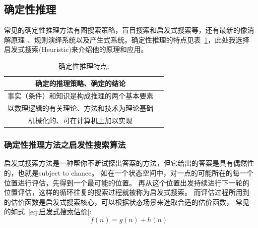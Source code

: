 \documentclass[12pt,a4paper,UTF8]{ctexart}
\begin{document}
\subsection{确定性推理}
常见的确定性推理方法有图搜索策略，盲目搜索和启发式搜索等，还有最新的像消解原理
、规则演绎系统以及产生式系统。确定性推理的特点见表~\ref{table:qdx特点}，此处我选择启发式搜索(Heuristic)来介绍他的原理和应用。
\begin{table}[htb]
    \centering
    \caption{确定性推理特点.}
    \label{table:qdx特点}
    \begin{tabular}{@{}cc@{}}
    \toprule
    确定的推理策略、确定的结论                             \\ \hline
    \multicolumn{1}{l}{事实（条件）和知识是构成推理的两个基本要素} \\ \hline
    以数理逻辑的有关理论、方法和技术为理论基础                     \\ \hline
    机械化的、可在计算机上加以实现                           \\ \hline
    \toprule
    \end{tabular}
\end{table}
\subsubsection{确定性推理方法之启发性搜索算法}
启发式搜索方法是一种帮你不断试探出答案的方法，但它给出的答案是具有偶然性的，也就是subject to chance。
如在一个状态空间中，对一点的可能所在的每一个位置进行评估，先得到一个最可能的位置。
再从这个位置出发持续进行下一轮的位置评估，这样的循环往复的搜索过程就被称为启发式搜索。
而评估过程所用到的估价函数是启发式搜索核心，可以根据状态场景来选取合适的估价函数，
常见的如式~\ref{eq:启发式搜索估价}:
\begin{equation}
    f(n)=g(n)+h(n)
    \label{eq:启发式搜索估价}
\end{equation}
\end{document}
